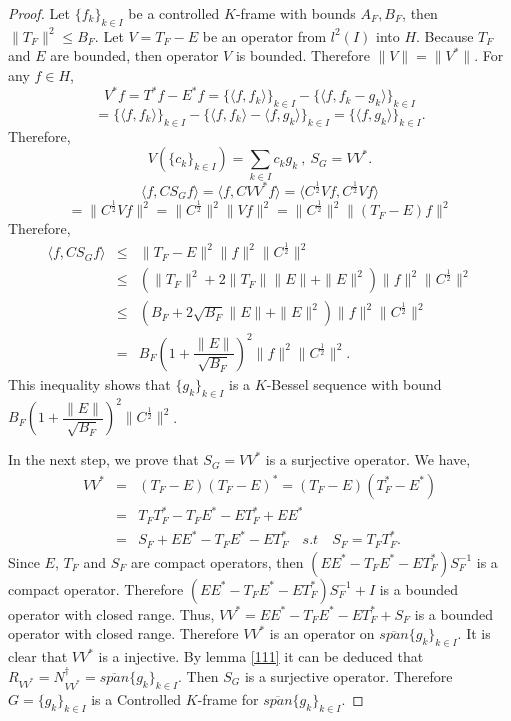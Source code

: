 \documentclass[11pt]{amsart}
\theoremstyle{definition}
\theoremstyle{remark}
\numberwithin{equation}{section}
\begin{document}
\begin{proof}
Let $\{f_k\}_{k\in I}$ be a controlled $K$-frame with bounds $A_F,B_F$, then $\|T_F\|^2\le B_F$.
Let $V=T_F-E$ be an operator from $l^2(I)$ into $H$. Because $T_F$ and $E$ are bounded, then operator $V$ is bounded. Therefore $\|V\|=\|V^*\|$. For any $f\in H$,
\[V^*f=T^*f-E^*f=\{\langle f,f_k\rangle\}_{k\in I}- \{\langle f,f_k-g_k\rangle\}_{k\in I}\]
\[=\{\langle f,f_k\rangle\}_{k\in I}- \{\langle f,f_k\rangle-\langle f,g_k\rangle\}_{k\in I}=\{\langle f,g_k\rangle\}_{k\in I}.\]
Therefore,
\[V(\{c_k\}_{k\in I})=\sum_{k\in I}c_kg_k\ ,\ S_G=VV^*.\]
\[\langle f,CS_Gf\rangle=\langle f,CVV^*f\rangle=\langle C^{\frac{1}{2}}Vf,C^{\frac{1}{2}}Vf\rangle\]
\[=\|C^{\frac{1}{2}}Vf\|^2=\|C^{\frac{1}{2}}\|^2\|Vf\|^2= \|C^{\frac{1}{2}}\|^2\|(T_F-E)f\|^2\]
Therefore,
\begin{eqnarray*}
\langle f,CS_Gf\rangle & \le & \|T_F-E\|^2\|f\|^2\|C^{\frac{1}{2}}\|^2\\
 & \le & (\|T_F\|^2+2\|T_F\|\|E\|+\|E\|^2)\|f\|^2\|C^{\frac{1}{2}}\|^2\\
 & \le & (B_F+2\sqrt{B_F}\|E\|+\|E\|^2)\|f\|^2\|C^{\frac{1}{2}}\|^2\\
 & = & B_F(1+\dfrac{\|E\|}{\sqrt{B_F}})^2\|f\|^2\|C^{\frac{1}{2}}\|^2.
\end{eqnarray*}
This inequality shows that $\{g_k\}_{k\in I}$ is a $K$-Bessel sequence with bound $B_F(1+\dfrac{\|E\|}{\sqrt{B_F}})^2\|C^{\frac{1}{2}}\|^2$.

In the next step, we prove that $S_G=VV^*$ is a surjective operator. We have,
\begin{eqnarray*}
VV^* & = & (T_F-E)(T_F-E)^*=(T_F-E)(T_F^*-E^*)\\
 & = & T_FT_F^*-T_FE^*-ET_F^*+EE^*\\
 & = & S_F+EE^*-T_FE^*-ET_F^*\quad s.t \quad S_F=T_FT_F^*.
\end{eqnarray*}
Since $E$, $T_F$ and $S_F$ are compact operators, then $(EE^*-T_FE^*-ET_F^*)S_F^{-1}$ is a compact operator. Therefore $(EE^*-T_FE^*-ET_F^*)S_F^{-1}+I$ is a bounded operator with closed range. Thus, $VV^*=EE^*-T_FE^*-ET_F^*+S_F$ is a bounded operator with closed range. Therefore $VV^*$ is an operator on $\overline{span}\{g_k\}_{k\in I}$. It is clear that $VV^*$ is a injective. By lemma \ref{111} it can be deduced that $R_{VV^*}=N_{VV^*}^{\dag}=\overline{span}\{g_k\}_{k\in I}$. Then $S_G$ is a surjective operator.
Therefore $G=\{g_k\}_{k\in I}$ is a Controlled $K$-frame for $\overline{span}\{g_k\}_{k\in I}$.
\end{proof}
\end{document}
